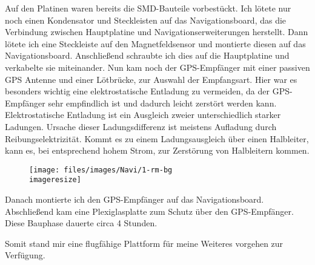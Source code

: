 Auf den Platinen waren bereits die \acs{SMD}-Bauteile vorbestückt.
Ich lötete nur noch einen Kondensator
und Steckleisten auf das Navigationsboard, das die Verbindung zwischen Hauptplatine
und Navigationserweiterungen herstellt.
Dann lötete ich eine Steckleiste auf den Magnetfeldsensor
und montierte diesen auf das Navigationsboard.
Anschließend schraubte ich dies auf die
Hauptplatine und verkabelte sie miteinander.
Nun kam noch der \ac{GPS}-Empfänger
mit einer passiven \ac{GPS} Antenne
und einer Lötbrücke, zur Auswahl der Empfangsart.
Hier war es besonders wichtig eine elektrostatische Entladung zu vermeiden,
da der \ac{GPS}-Empfänger sehr empfindlich ist
und dadurch leicht zerstört werden kann.
Elektrostatische Entladung ist ein Ausgleich zweier unterschiedlich starker Ladungen.
Ursache dieser Ladungsdifferenz ist meistens Aufladung durch Reibungselektrizität.
Kommt es zu einem Ladungsausgleich über einen Halbleiter, kann es,
bei entsprechend hohem Strom, zur Zerstörung von Halbleitern kommen.

\begin{figure}\centering
	\texttt{[image: files/images/Navi/1-rm-bg\\imageresize]}
	\label{fig:Navigationseinheit}
\end{figure}

Danach montierte ich den \ac{GPS}-Empfänger auf das Navigationsboard.
Abschließend kam eine Plexiglasplatte zum Schutz über den \ac{GPS}-Empfänger.
Diese Bauphase dauerte circa 4 Stunden.

Somit stand mir eine flugfähige Plattform
für meine Weiteres vorgehen zur Verfügung.
